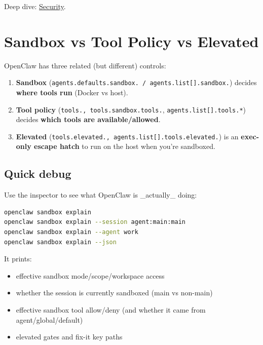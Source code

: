 Deep dive: \href{/gateway/security}{Security}.


\clearpage

\section{Sandbox vs Tool Policy vs Elevated}


OpenClaw has three related (but different) controls:

\begin{enumerate}
  \item \textbf{Sandbox} (\texttt{agents.defaults.sandbox.\textit{} / \texttt{agents.list[].sandbox.}}) decides \textbf{where tools run} (Docker vs host).
  \item \textbf{Tool policy} (\texttt{tools.\textit{}, \texttt{tools.sandbox.tools.}}, \texttt{agents.list[].tools.*}) decides \textbf{which tools are available/allowed}.
  \item \textbf{Elevated} (\texttt{tools.elevated.\textit{}, \texttt{agents.list[].tools.elevated.}}) is an \textbf{exec-only escape hatch} to run on the host when you’re sandboxed.
\end{enumerate}


\subsection{Quick debug}


Use the inspector to see what OpenClaw is \_actually\_ doing:

\begin{lstlisting}[language=bash]
openclaw sandbox explain
openclaw sandbox explain --session agent:main:main
openclaw sandbox explain --agent work
openclaw sandbox explain --json
\end{lstlisting}


It prints:

\begin{itemize}
  \item effective sandbox mode/scope/workspace access
  \item whether the session is currently sandboxed (main vs non-main)
  \item effective sandbox tool allow/deny (and whether it came from agent/global/default)
  \item elevated gates and fix-it key paths
\end{itemize}


